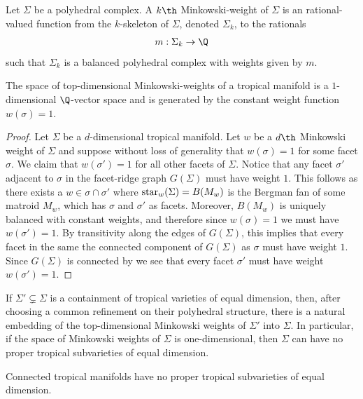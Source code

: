 \begin{definition}
    Let $\Sigma$ be a polyhedral complex. A $k\th$ Minkowski-weight of $\Sigma$ is an rational-valued function from the $k$-skeleton of $\Sigma$, denoted $\Sigma_k$, to the rationals
    \begin{align*}
        m:\Sigma_k \to \Q
    \end{align*}
    such that $\Sigma_k$ is a balanced polyhedral complex with weights given by $m$. 
\end{definition}


\begin{corollary}\label{cor:minkWeights}
The space of top-dimensional Minkowski-weights of a tropical manifold is a $1$-dimensional $\Q$-vector space and is generated by the constant weight function $w(\sigma)=1$. 
\end{corollary}
\begin{proof}
    Let $\Sigma$ be a $d$-dimensional tropical manifold. Let $w$ be a $d\th$ Minkowski weight of $\Sigma$ and suppose without loss of generality that $w(\sigma)=1$ for some facet $\sigma$. We claim that $w(\sigma')=1$ for all other facets of $\Sigma$. Notice that any facet $\sigma'$ adjacent to $\sigma$ in the facet-ridge graph $G(\Sigma)$ must have weight $1$. This follows as there exists a $w\in \sigma\cap\sigma'$ where $\operatorname{star}_w(\Sigma)=B(M_w)$ is the Bergman fan of some matroid $M_w$, which has $\sigma$ and $\sigma'$ as facets. Moreover, $B(M_w)$ is uniquely balanced with constant weights, and therefore since $w(\sigma)=1$ we must have $w(\sigma')=1$. By transitivity along the edges of $G(\Sigma)$, this implies that every facet in the same the connected component of $G(\Sigma)$ as $\sigma$ must have weight $1$. Since $G(\Sigma)$ is connected by  we see that every facet $\sigma'$ must have weight $w(\sigma')=1$.
    
\end{proof}
If $\Sigma'\subsetneq \Sigma$ is a containment of tropical varieties of equal dimension, then, after choosing a common refinement on their polyhedral structure, there is a natural embedding of the top-dimensional Minkowski weights of $\Sigma'$ into $\Sigma$. In particular, if the space of Minkowski weights of $\Sigma$ is one-dimensional, then $\Sigma$ can have no proper tropical subvarieties of equal dimension.

\begin{corollary}
    Connected tropical manifolds have no proper tropical subvarieties of equal dimension.
\end{corollary}

